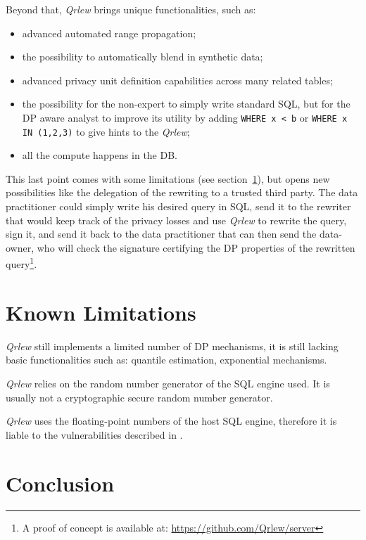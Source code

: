 \documentclass{article}
\newcommand{\qrlew}{\emph{Qrlew}}
\begin{document}
    Beyond that, \qrlew{} brings unique functionalities, such as:
    \begin{itemize}
        \item advanced automated range propagation;
        \item the possibility to automatically blend in synthetic data;
        \item advanced privacy unit definition capabilities across many related tables;
        \item the possibility for the non-expert to simply write standard SQL, but for the DP aware analyst to improve its utility by adding \texttt{WHERE x < b} or \texttt{WHERE x IN (1,2,3)} to give hints to the \qrlew{};
        \item all the compute happens in the DB.
    \end{itemize}
    
    This last point comes with some limitations (see section~\ref{sec:limitations}), but opens new possibilities like the delegation of the rewriting to a trusted third party. The data practitioner could simply write his desired query in SQL, send it to the rewriter that would keep track of the privacy losses and use \qrlew{} to rewrite the query, sign it, and send it back to the data practitioner that can then send the data-owner, who will check the signature certifying the DP properties of the rewritten query\footnote{A proof of concept is available at: \url{https://github.com/Qrlew/server}}.
    
    \section{Known Limitations}
    \label{sec:limitations}
    
    \qrlew{} still implements a limited number of DP mechanisms, it is still lacking basic functionalities such as: quantile estimation, exponential mechanisms.
    
    \qrlew{} relies on the random number generator of the SQL engine used. It is usually not a cryptographic secure random number generator.
    
    \qrlew{} uses the floating-point numbers of the host SQL engine, therefore it is liable to the vulnerabilities described in \cite{casacuberta2022widespread}.
    
    \section{Conclusion}
    
\end{document}
